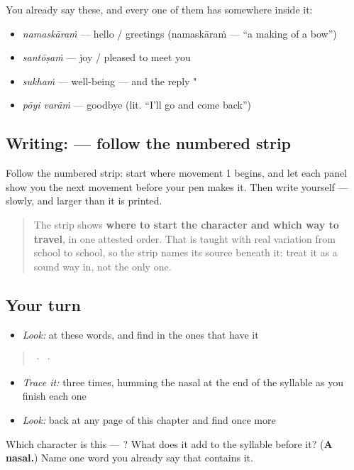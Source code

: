 You already say these, and every one of them has  somewhere inside it:

\begin{itemize}
\raggedright
  \item \textbf{} \emph{namaskāraṁ} — hello / greetings (namaskāraṁ — \textquotedblleft{}a making of a bow\textquotedblright{})
  \item \textbf{} \emph{santōṣaṁ} — joy / pleased to meet you
  \item \textbf{} \emph{sukhaṁ} — well-being — and the reply "
  \item \textbf{ } \emph{pōyi varāṁ} — goodbye (lit. \textquotedblleft{}I'll go and come back\textquotedblright{})
\end{itemize}

\subsection*{Writing:  — follow the numbered strip}

Follow the numbered strip: start where movement 1 begins, and let each panel show you the next movement before your pen makes it. Then write  yourself — slowly, and larger than it is printed.

\begin{quote}
The strip shows \textbf{where to start the character and which way to travel}, in one attested order. That is taught with real variation from school to school, so the strip names its source beneath it: treat it as a sound way in, not the only one.
\end{quote}

\subsection*{Your turn}
\begin{itemize}
\raggedright
  \item \emph{Look:} at these words, and find  in the ones that have it
\end{itemize}

\begin{quote}
  ·    ·  
\end{quote}

\begin{itemize}
\raggedright
  \item \emph{Trace it:}  three times, humming the nasal at the end of the syllable as you finish each one
  \item \emph{Look:} back at any page of this chapter and find  once more
\end{itemize}

\begin{tcolorbox}[breakable,colback=teal!4,colframe=teal!35!black,title={Before you move on}]
Which character is this — ? What does it add to the syllable before it? (\textbf{A nasal.}) Name one word you already say that contains it.
\end{tcolorbox}
